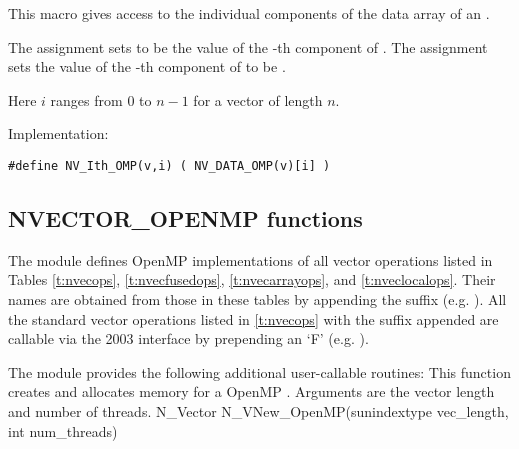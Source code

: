 \begin{itemize}
  This macro gives access to the individual components of the data
  array of an .

  The assignment  sets  to be the value of
  the -th component of . The assignment 
  sets the value of the -th component of  to be .

  Here $i$ ranges from $0$ to $n-1$ for a vector of length $n$.

  Implementation:

  \verb|#define NV_Ith_OMP(v,i) ( NV_DATA_OMP(v)[i] )|

\end{itemize}


\subsection{NVECTOR\_OPENMP functions}
\label{ss:nvec_openmp_functions}

The {\nvecopenmp} module defines OpenMP implementations of all vector operations listed
in Tables \ref{t:nvecops}, \ref{t:nvecfusedops}, \ref{t:nvecarrayops},
and \ref{t:nveclocalops}. Their names are obtained from those in these
tables by appending the suffix  (e.g. ).
All the standard vector operations listed in \ref{t:nvecops} with the suffix
 appended are callable via the {\F} 2003 interface by prepending an
`F' (e.g. ).

The module {\nvecopenmp} provides the following additional user-callable routines:
{
 This function creates and allocates memory for a OpenMP .
 Arguments are the vector length and number of threads.
}
{
 N\_Vector N\_VNew\_OpenMP(sunindextype vec\_length, int num\_threads)
}


